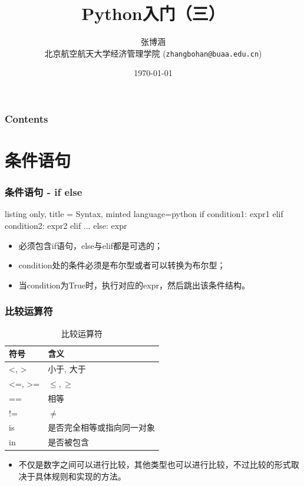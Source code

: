 \documentclass[10pt]{beamer}
\title{Python入门（三）}
\author{张博涵\\
北京航空航天大学经济管理学院 (\texttt{zhangbohan@buaa.edu.cn})}
\date{\today}
\begin{document}
\begin{frame}
    \maketitle
\end{frame}


\begin{frame}
    \frametitle{Contents}

    \tableofcontents

\end{frame}


\section{条件语句}

\begin{frame}[fragile]
\frametitle{条件语句 - if else}

\begin{tcblisting}{listing only, title = Syntax, minted language=python}
if condition1:
    expr1
elif condition2:
    expr2
elif ...
else:
    expr
\end{tcblisting}

\begin{itemize}
    \item 必须包含if语句，else与elif都是可选的；
    \item condition处的条件必须是布尔型或者可以转换为布尔型；
    \item 当condition为True时，执行对应的expr，然后跳出该条件结构。
\end{itemize}
\end{frame}


\begin{frame}
    \frametitle{比较运算符}

    \begin{table}
        \caption{比较运算符}
        \begin{tabular}{ll} \\ \toprule
            符号 & 含义 \\ \midrule
            <, > & 小于, 大于 \\
            <=, >= & $\leq, \geq$ \\
            == & 相等 \\
            != & $\neq$ \\
            is & 是否完全相等或指向同一对象 \\
            in & 是否被包含 \\\bottomrule
        \end{tabular}
    \end{table}
    \begin{itemize}
        \item 不仅是数字之间可以进行比较，其他类型也可以进行比较，不过比较的形式取决于具体规则和实现的方法。
    \end{itemize}
\end{frame}
\end{document}

